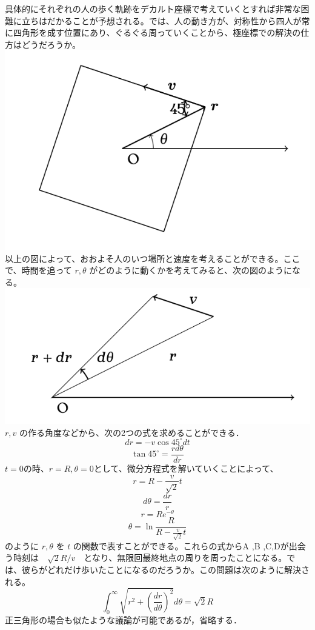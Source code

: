 \documentclass[
  b4paperpaper,
  xelatex,ja=standard]{bxjsbook}
\begin{document}

具体的にそれぞれの人の歩く軌跡をデカルト座標で考えていくとすれば非常な困難に立ちはだかることが予想される。では、人の動き方が、対称性から四人が常に四角形を成す位置にあり、ぐるぐる周っていくことから、極座標での解決の仕方はどうだろうか。
\includegraphics{source/images/velocity/mondai3.png}
以上の図によって、おおよそ人のいつ場所と速度を考えることができる。ここで、時間を追って
\(r,\theta\) がどのように動くかを考えてみると、次の図のようになる。
\includegraphics{source/images/velocity/mondai4.png} \(r,v\)
の作る角度などから、次の2つの式を求めることができる．
\[dr=-v\cos 45^\circ dt\] \[\tan 45 ^\circ = \frac{rd\theta}{dr}\]
\(t=0\)の時、\(r=R,\theta=0\)として、微分方程式を解いていくことによって、
\[r=R-\frac{v}{\sqrt{2}}t\] \[d\theta=\frac{dr}{r}\] \[r=Re^{-\theta}\]
\[\theta = \ln \frac{R}{R-\frac{v}{\sqrt{2}}t}\] のように \(r,\theta\)
を \(t\) の関数で表すことができる。これらの式からA ,B
,C,Dが出会う時刻は　\(\sqrt{2}R/v\)　となり、無限回最終地点の周りを周ったことになる。では、彼らがどれだけ歩いたことになるのだろうか。この問題は次のように解決される。
\[\int_0^\infty \sqrt{r^2+(\frac{dr}{d\theta})^2} d\theta=\sqrt{2}R\]
正三角形の場合も似たような議論が可能であるが，省略する．
\end{document}
